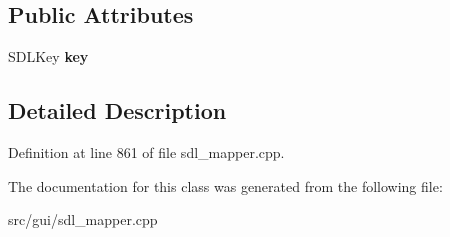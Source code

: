 \subsection*{Public Attributes}
\begin{DoxyCompactItemize}
\item 
\hypertarget{classCKeyBind_a5db2e06f00521cdcd4bdf961cb02c336}{S\-D\-L\-Key {\bfseries key}}\label{classCKeyBind_a5db2e06f00521cdcd4bdf961cb02c336}

\end{DoxyCompactItemize}


\subsection{Detailed Description}


Definition at line 861 of file sdl\-\_\-mapper.\-cpp.



The documentation for this class was generated from the following file\-:\begin{DoxyCompactItemize}
\item 
src/gui/sdl\-\_\-mapper.\-cpp\end{DoxyCompactItemize}
